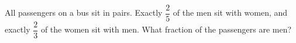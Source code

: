 All passengers on a bus sit in pairs. Exactly $\dfrac25$ of the men sit with women, and exactly $\dfrac23$ of the women sit with men. What fraction of the passengers are men?
